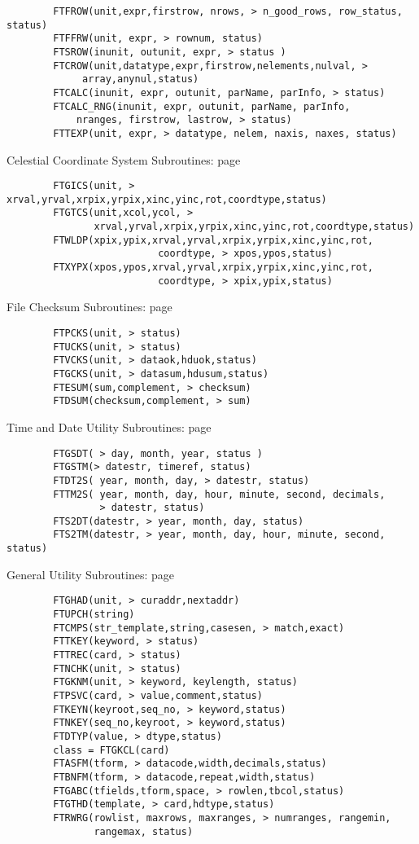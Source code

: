 \documentclass[11pt]{book}
\begin{document}
\begin{verbatim}
        FTFROW(unit,expr,firstrow, nrows, > n_good_rows, row_status, status)
        FTFFRW(unit, expr, > rownum, status)
        FTSROW(inunit, outunit, expr, > status )
        FTCROW(unit,datatype,expr,firstrow,nelements,nulval, >
             array,anynul,status)
        FTCALC(inunit, expr, outunit, parName, parInfo, > status)
        FTCALC_RNG(inunit, expr, outunit, parName, parInfo,
            nranges, firstrow, lastrow, > status)
        FTTEXP(unit, expr, > datatype, nelem, naxis, naxes, status)
\end{verbatim}
 Celestial Coordinate System Subroutines: page~\pageref{FTGICS}

\begin{verbatim}
        FTGICS(unit, > xrval,yrval,xrpix,yrpix,xinc,yinc,rot,coordtype,status)
        FTGTCS(unit,xcol,ycol, >
               xrval,yrval,xrpix,yrpix,xinc,yinc,rot,coordtype,status)
        FTWLDP(xpix,ypix,xrval,yrval,xrpix,yrpix,xinc,yinc,rot,
                          coordtype, > xpos,ypos,status)
        FTXYPX(xpos,ypos,xrval,yrval,xrpix,yrpix,xinc,yinc,rot,
                          coordtype, > xpix,ypix,status)
\end{verbatim}
 File Checksum Subroutines: page~\pageref{FTPCKS}

\begin{verbatim}
        FTPCKS(unit, > status)
        FTUCKS(unit, > status)
        FTVCKS(unit, > dataok,hduok,status)
        FTGCKS(unit, > datasum,hdusum,status)
        FTESUM(sum,complement, > checksum)
        FTDSUM(checksum,complement, > sum)

\end{verbatim}
 Time and Date Utility Subroutines: page~\pageref{FTGSDT}

\begin{verbatim}
        FTGSDT( > day, month, year, status )
        FTGSTM(> datestr, timeref, status)
        FTDT2S( year, month, day, > datestr, status)
        FTTM2S( year, month, day, hour, minute, second, decimals,
                > datestr, status)
        FTS2DT(datestr, > year, month, day, status)
        FTS2TM(datestr, > year, month, day, hour, minute, second, status)
\end{verbatim}
 General Utility Subroutines: page~\pageref{FTGHAD}

\begin{verbatim}
        FTGHAD(unit, > curaddr,nextaddr)
        FTUPCH(string)
        FTCMPS(str_template,string,casesen, > match,exact)
        FTTKEY(keyword, > status)
        FTTREC(card, > status)
        FTNCHK(unit, > status)
        FTGKNM(unit, > keyword, keylength, status)
        FTPSVC(card, > value,comment,status)
        FTKEYN(keyroot,seq_no, > keyword,status)
        FTNKEY(seq_no,keyroot, > keyword,status)
        FTDTYP(value, > dtype,status)
        class = FTGKCL(card)
        FTASFM(tform, > datacode,width,decimals,status)
        FTBNFM(tform, > datacode,repeat,width,status)
        FTGABC(tfields,tform,space, > rowlen,tbcol,status)
        FTGTHD(template, > card,hdtype,status)
        FTRWRG(rowlist, maxrows, maxranges, > numranges, rangemin,
               rangemax, status)
\end{verbatim}

\end{document}
